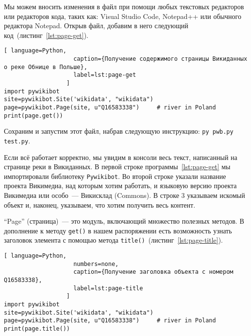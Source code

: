 Мы можем вносить изменения в файл при помощи любых текстовых редакторов 
или редакторов кода, таких как: 
Visual Studio Code, Notepad++ или обычного редактора Notepad. 
Открыв файл, добавим в него следующий код~(листинг~\ref{lst:page-get}).

%
\begin{lstlisting}[ language=Python,
                    caption={Получение содержимого страницы Викиданных о реке Обнице в Польше},
                    label=lst:page-get
                  ]
import pywikibot
site=pywikibot.Site('wikidata', "wikidata")
page=pywikibot.Page(site, u"Q16583338")     # river in Poland
print(page.get())
\end{lstlisting}

Сохраним и запустим этот файл, набрав следующую инструкцию: \lstinline|py pwb.py test.py|.

Если всё работает корректно, мы увидим в консоли весь текст, 
написанный на странице реки  в Викиданных. 
В первой строке программы~\ref{lst:page-get} мы импортировали библиотеку \lstinline|Pywikibot|. 
Во второй строке указали название проекта Викимедиа, над которым хотим работать, 
и языковую версию проекта Викимедиа или особо~--- Викисклад (Commons). 
%
В строке 3 указываем искомый объект и, наконец, указываем, что хотим получить весь контент.


``Page'' (страница)~--- это модуль, включающий множество полезных методов. 
%
В дополнение к методу \lstinline|get()| в нашем распоряжении есть возможность 
узнать заголовок элемента с помощью метода \lstinline|title()|~(листинг~\ref{lst:page-title}).

\begin{lstlisting}[ language=Python,
                    numbers=none,
                    caption={Получение заголовка объекта с номером Q16583338},
                    label=lst:page-title
                  ]
import pywikibot
site=pywikibot.Site('wikidata', "wikidata")
page=pywikibot.Page(site, u"Q16583338")     # river in Poland
print(page.title())
\end{lstlisting}

